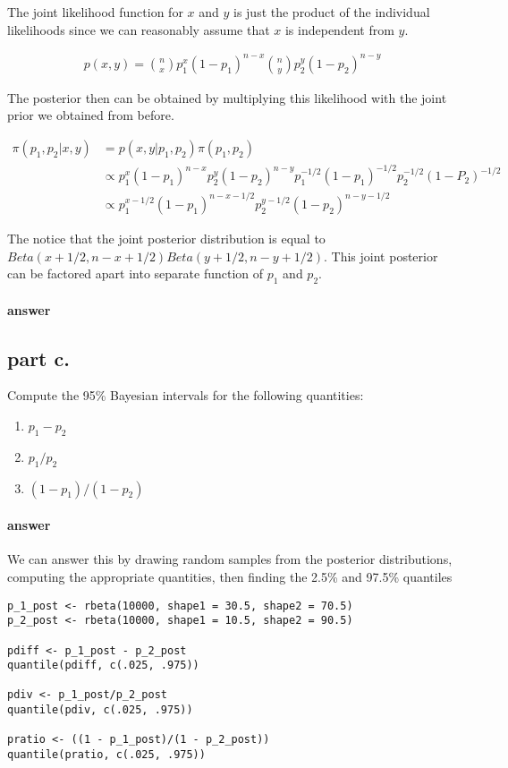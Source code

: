 \documentclass[12pt,a4paper]{article}
\begin{document}
The joint likelihood function for $x$ and $y$ is just the product of the individual likelihoods since we can reasonably assume that $x$ is independent from $y$.

\begin{align*}
	p(x, y) = \binom{n}{x} p_1^x (1 - p_1)^{n-x} \binom{n}{y} p_2^y (1 - p_2)^{n-y}
\end{align*}

The posterior then can be obtained by multiplying this likelihood with the joint prior we obtained from before.

\begin{align*}
	\pi(p_1, p_2 | x, y) &= p(x, y | p_1, p_2) \pi(p_1, p_2) \\
						 &\propto p_1^x (1 - p_1)^{n-x} p_2^y(1-p_2)^{n-y} p_1^{-1/2} (1 - p_1)^{-1/2} p_2^{-1/2} (1 - P_2)^{-1/2} \\
						 &\propto p_1^{x - 1/2} (1 - p_1)^{n - x - 1/2} p_2^{y - 1/2} (1 - p_2)^{n - y - 1/2}
\end{align*}

The notice that the joint posterior distribution is equal to $Beta(x + 1/2, n - x + 1/2) Beta (y + 1/2, n - y + 1/2)$.
This joint posterior can be factored apart into separate function of $p_1$ and $p_2$.

\paragraph{answer} 

\subsection{part c.}
Compute the 95\% Bayesian intervals for the following quantities:

\begin{enumerate}
	\item $p_1 - p_2$
	\item $p_1/p_2$
	\item $(1 - p_1)/(1 - p_2)$
\end{enumerate}

\paragraph{answer} We can answer this by drawing random samples from the posterior distributions, computing the appropriate quantities, then finding the 2.5\% and 97.5\% quantiles

\begin{lstlisting}
p_1_post <- rbeta(10000, shape1 = 30.5, shape2 = 70.5)
p_2_post <- rbeta(10000, shape1 = 10.5, shape2 = 90.5)

pdiff <- p_1_post - p_2_post
quantile(pdiff, c(.025, .975))

pdiv <- p_1_post/p_2_post
quantile(pdiv, c(.025, .975))

pratio <- ((1 - p_1_post)/(1 - p_2_post))
quantile(pratio, c(.025, .975))
\end{lstlisting}
\end{document}
